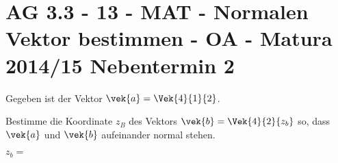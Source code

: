 \section{AG 3.3 - 13 - MAT - Normalen Vektor bestimmen - OA - Matura 2014/15 Nebentermin 2}

\begin{beispiel}[AG 3.3]{1} %
				Gegeben ist der Vektor $\vek{a}=\Vek{4}{1}{2}$.
				
				Bestimme die Koordinate $z_{B}$ des Vektors $\vek{b}=\Vek{4}{2}{z_{b}}$ so, dass $\vek{a}$ und $\vek{b}$ aufeinander normal stehen.\leer
				
				$z_{b}=$ 
\end{beispiel}